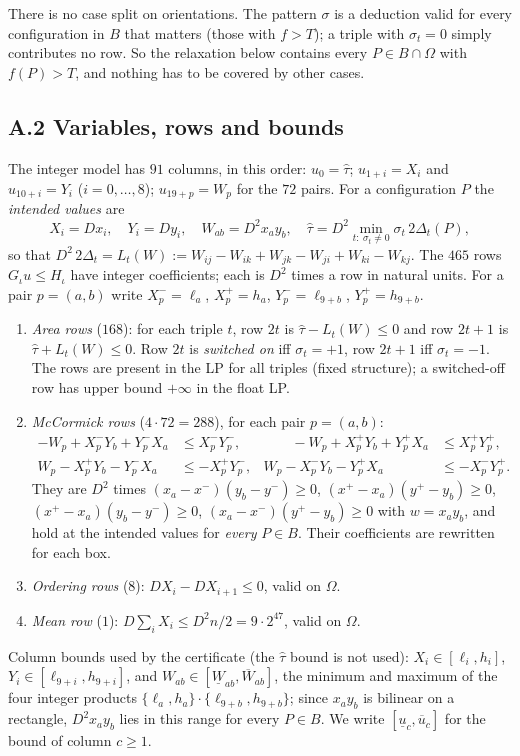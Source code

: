 \documentclass[11pt]{amsart}
\theoremstyle{definition}
\begin{document}
There is no case split on orientations. The pattern $\sigma$ is a deduction valid for every configuration in $B$ that matters (those with $f > T$); a triple with $\sigma_t = 0$ simply contributes no row. So the relaxation below contains every $P \in B \cap \Omega$ with $f(P) > T$, and nothing has to be covered by other cases.

\subsection*{A.2 Variables, rows and bounds}
The integer model has $91$ columns, in this order: $u_0 = \hat\tau$; $u_{1+i} = X_i$ and $u_{10+i} = Y_i$ ($i = 0,\dots,8$); $u_{19+p} = W_p$ for the $72$ pairs. For a configuration $P$ the \emph{intended values} are
\[
 X_i = Dx_i,\quad Y_i = Dy_i,\quad W_{ab} = D^2 x_a y_b,\quad \hat\tau = D^2 \min_{t:\ \sigma_t \ne 0} \sigma_t\, 2\Delta_t(P),
\]
so that $D^2\,2\Delta_t = L_t(W) := W_{ij} - W_{ik} + W_{jk} - W_{ji} + W_{ki} - W_{kj}$. The $465$ rows $G_\iota u \le H_\iota$ have integer coefficients; each is $D^2$ times a row in natural units. For a pair $p = (a,b)$ write $X^-_p = \ell_a$, $X^+_p = h_a$, $Y^-_p = \ell_{9+b}$, $Y^+_p = h_{9+b}$.
\begin{enumerate}[label=(R\arabic*)]
\item \emph{Area rows} ($168$): for each triple $t$, row $2t$ is $\hat\tau - L_t(W) \le 0$ and row $2t+1$ is $\hat\tau + L_t(W) \le 0$. Row $2t$ is \emph{switched on} iff $\sigma_t = +1$, row $2t+1$ iff $\sigma_t = -1$. The rows are present in the LP for all triples (fixed structure); a switched-off row has upper bound $+\infty$ in the float LP.
\item \emph{McCormick rows} ($4\cdot72 = 288$), for each pair $p = (a,b)$:
\[
\begin{aligned}
 -W_p + X^-_p Y_b + Y^-_p X_a &\le X^-_p Y^-_p, &\qquad -W_p + X^+_p Y_b + Y^+_p X_a &\le X^+_p Y^+_p,\\
 W_p - X^+_p Y_b - Y^-_p X_a &\le -X^+_p Y^-_p, & W_p - X^-_p Y_b - Y^+_p X_a &\le -X^-_p Y^+_p .
\end{aligned}
\]
They are $D^2$ times $(x_a - x^-)(y_b - y^-) \ge 0$, $(x^+ - x_a)(y^+ - y_b) \ge 0$, $(x^+ - x_a)(y_b - y^-) \ge 0$, $(x_a - x^-)(y^+ - y_b) \ge 0$ with $w = x_ay_b$, and hold at the intended values for \emph{every} $P \in B$. Their coefficients are rewritten for each box.
\item \emph{Ordering rows} ($8$): $D X_i - D X_{i+1} \le 0$, valid on $\Omega$.
\item \emph{Mean row} ($1$): $D\sum_i X_i \le D^2 n/2 = 9\cdot 2^{47}$, valid on $\Omega$.
\end{enumerate}
Column bounds used by the certificate (the $\hat\tau$ bound is not used): $X_i \in [\ell_i, h_i]$, $Y_i \in [\ell_{9+i}, h_{9+i}]$, and $W_{ab} \in [\underline W_{ab}, \overline W_{ab}]$, the minimum and maximum of the four integer products $\{\ell_a,h_a\}\cdot\{\ell_{9+b},h_{9+b}\}$; since $x_a y_b$ is bilinear on a rectangle, $D^2x_ay_b$ lies in this range for every $P \in B$. We write $[\underline u_c, \overline u_c]$ for the bound of column $c \ge 1$.
\end{document}
